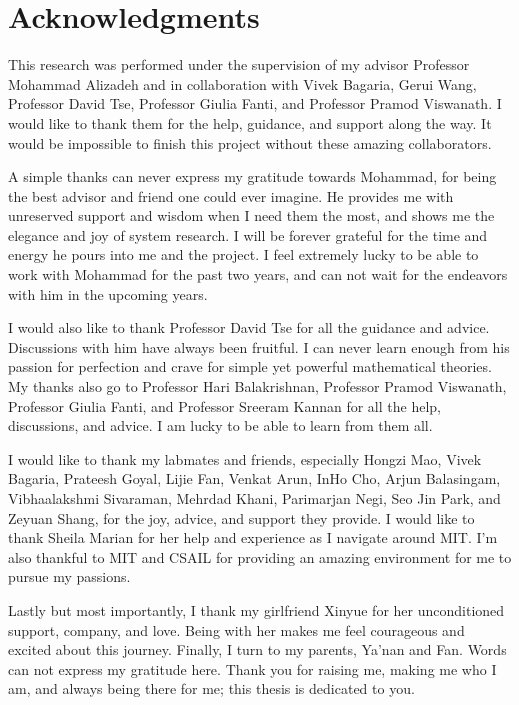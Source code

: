 % 

\cleardoublepage

\section*{Acknowledgments}

This research was performed under the supervision of my advisor Professor Mohammad Alizadeh and in collaboration with Vivek Bagaria, Gerui Wang, Professor David Tse, Professor Giulia Fanti, and Professor Pramod Viswanath. I would like to thank them for the help, guidance, and support along the way. It would be impossible to finish this project without these amazing collaborators.

A simple thanks can never express my gratitude towards Mohammad, for being the best advisor and friend one could ever imagine. He provides me with unreserved support and wisdom when I need them the most, and shows me the elegance and joy of system research. I will be forever grateful for the time and energy he pours into me and the project. I feel extremely lucky to be able to work with Mohammad for the past two years, and can not wait for the endeavors with him in the upcoming years.

I would also like to thank Professor David Tse for all the guidance and advice. Discussions with him have always been fruitful. I can never learn enough from his passion for perfection and crave for simple yet powerful mathematical theories. My thanks also go to Professor Hari Balakrishnan, Professor Pramod Viswanath, Professor Giulia Fanti, and Professor Sreeram Kannan for all the help, discussions, and advice. I am lucky to be able to learn from them all.

I would like to thank my labmates and friends, especially Hongzi Mao, Vivek Bagaria, Prateesh Goyal, Lijie Fan, Venkat Arun, InHo Cho, Arjun Balasingam, Vibhaalakshmi Sivaraman, Mehrdad Khani, Parimarjan Negi, Seo Jin Park, and Zeyuan Shang, for the joy, advice, and support they provide. I would like to thank Sheila Marian for her help and experience as I navigate around MIT. I'm also thankful to MIT and CSAIL for providing an amazing environment for me to pursue my passions.

Lastly but most importantly, I thank my girlfriend Xinyue for her unconditioned support, company, and love. Being with her makes me feel courageous and excited about this journey. Finally, I turn to my parents, Ya'nan and Fan. Words can not express my gratitude here. Thank you for raising me, making me who I am, and always being there for me; this thesis is dedicated to you.


